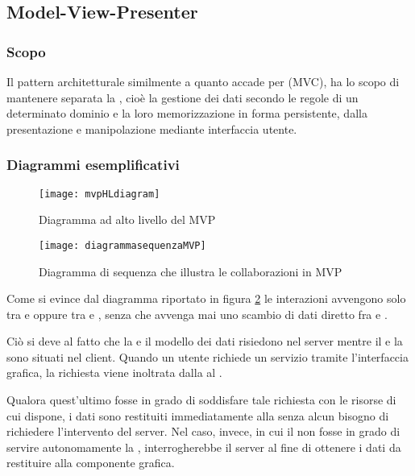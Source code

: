 \subsection{Model-View-Presenter}\label{sec:MVP}

\subsubsection{Scopo}
Il pattern architetturale  similmente a quanto accade per  (MVC), ha lo scopo di mantenere separata la , cioè la gestione dei dati secondo le regole di un determinato dominio e la loro memorizzazione in forma persistente, dalla presentazione e manipolazione mediante interfaccia utente.

\subsubsection{Diagrammi esemplificativi}
\begin{figure}[H]
\centering
\texttt{[image: mvpHLdiagram]}
\caption{Diagramma ad alto livello del  MVP}\label{fig:mvpHL}
\end{figure}

\begin{figure}[H]
\centering
\texttt{[image: diagrammasequenzaMVP]}
\caption{Diagramma di sequenza che illustra le collaborazioni in MVP}\label{fig:mvpSD}
\end{figure}

Come si evince dal diagramma riportato in figura \ref{fig:mvpSD} le interazioni avvengono solo tra  e  oppure tra  e , senza che avvenga mai uno scambio di dati diretto fra  e .

Ciò si deve al fatto che la  e il modello dei dati risiedono nel server mentre il  e la  sono situati nel client. Quando un utente richiede un servizio tramite l'interfaccia grafica, la richiesta viene inoltrata dalla  al .

Qualora quest'ultimo fosse in grado di soddisfare tale richiesta con le risorse di cui dispone, i dati sono restituiti immediatamente alla  senza alcun bisogno di richiedere l'intervento del server. Nel caso, invece, in cui il  non fosse in grado di servire autonomamente la , interrogherebbe il server al fine di ottenere i dati da restituire alla componente grafica.

